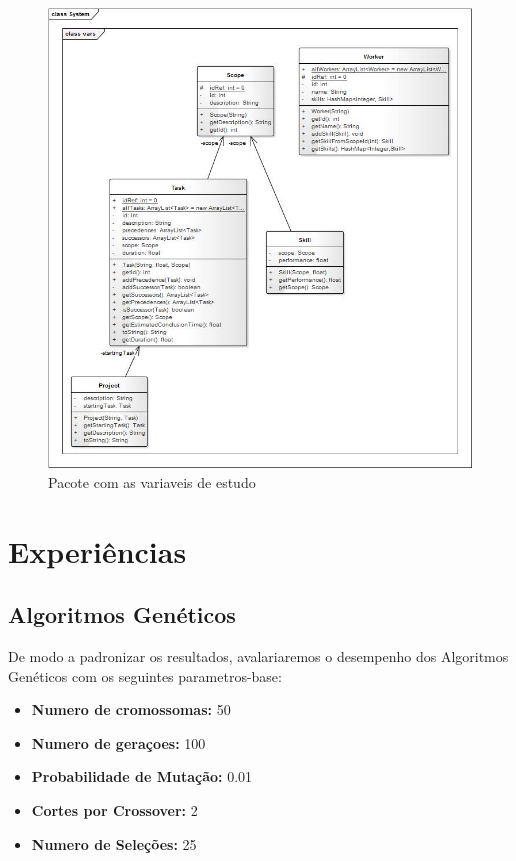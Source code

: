 \documentclass[a4paper]{article}
\begin{document}
\begin{figure}
	\centering
	\includegraphics[scale=0.4]{uml5.png}
	\caption{Pacote com as variaveis de estudo}
\end{figure}
\paragraph{}

\newpage
\newpage
\section{Experiências}
\subsection{Algoritmos Genéticos}
De modo a padronizar os resultados, avalariaremos o desempenho dos Algoritmos Genéticos com os seguintes parametros-base:
\begin{itemize}
	\item \textbf{Numero de cromossomas:} 50
	\item \textbf{Numero de geraçoes:} 100
	\item \textbf{Probabilidade de Mutação:} 0.01
	\item \textbf{Cortes por Crossover:} 2
	\item \textbf{Numero de Seleções:} 25
\end{itemize}
\end{document}

